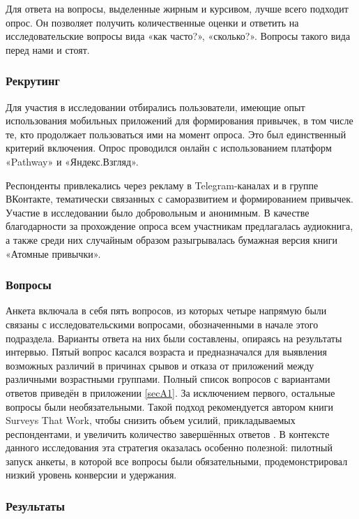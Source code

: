 \documentclass[pdflatex,sn-mathphys-num]{sn-jnl}%
\theoremstyle{thmstyleone}%
\theoremstyle{thmstyletwo}%
\theoremstyle{thmstylethree}%
\begin{document}
Для ответа на вопросы, выделенные жирным и курсивом, лучше всего подходит опрос. Он позволяет получить количественные оценки и ответить на исследовательские вопросы вида «как часто?», «сколько?». Вопросы такого вида перед нами и стоят.

\subsubsection{Рекрутинг}

Для участия в исследовании отбирались пользователи, имеющие опыт использования мобильных приложений для формирования привычек, в том числе те, кто продолжает пользоваться ими на момент опроса. Это был единственный критерий включения. Опрос проводился онлайн с использованием платформ «Pathway» и «Яндекс.Взгляд».

Респонденты привлекались через рекламу в Telegram-каналах и в группе ВКонтакте, тематически связанных с саморазвитием и формированием привычек. Участие в исследовании было добровольным и анонимным. В качестве благодарности за прохождение опроса всем участникам предлагалась аудиокнига, а также среди них случайным образом разыгрывалась бумажная версия книги «Атомные привычки».

\subsubsection{Вопросы}

Анкета включала в себя пять вопросов, из которых четыре напрямую были связаны с исследовательскими вопросами, обозначенными в начале этого подраздела. Варианты ответа на них были составлены, опираясь на результаты интервью. Пятый вопрос касался возраста и предназначался для выявления возможных различий в причинах срывов и отказа от приложений между различными возрастными группами. Полный список вопросов с вариантами ответов приведён в приложении \ref{secA1}. За исключением первого, остальные вопросы были необязательными. Такой подход рекомендуется автором книги Surveys That Work, чтобы снизить объем усилий, прикладываемых респондентами, и увеличить количество завершённых ответов \cite{jarrett2021surveys}. В контексте данного исследования эта стратегия оказалась особенно полезной: пилотный запуск анкеты, в которой все вопросы были обязательными, продемонстрировал низкий уровень конверсии и удержания. 

\subsubsection{Результаты}
\end{document}
